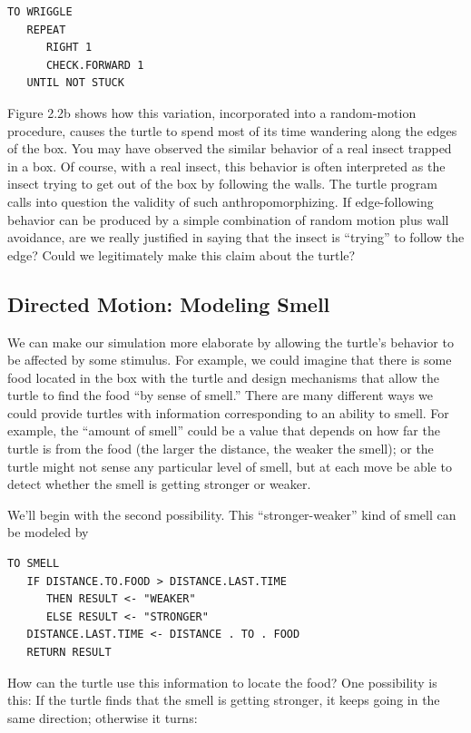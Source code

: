 \documentclass{book}
\begin{document}
\begin{verbatim}
TO WRIGGLE
   REPEAT
      RIGHT 1
      CHECK.FORWARD 1
   UNTIL NOT STUCK
\end{verbatim}
Figure 2.2b shows how this variation, incorporated into a random-motion
procedure, causes the turtle to spend most of its time wandering along
the edges of the box. You may have observed the similar behavior of
a real insect trapped in a box. Of course, with a real insect, this
behavior is often interpreted as the insect trying to get out of the
box by following the walls. The turtle program calls into question
the validity of such anthropomorphizing. If edge-following behavior
can be produced by a simple combination of random motion plus wall
avoidance, are we really justified in saying that the insect is ``trying'' to
follow the edge? Could we legitimately make this claim about the turtle?

\subsection{Directed Motion: Modeling Smell}

We can make our simulation more elaborate by allowing the turtle's
behavior to be affected by some stimulus. For example, we could imagine
that there is some food located in the box with the turtle and design
mechanisms that allow the turtle to find the food ``by sense of smell.''
There are many different ways we could provide turtles with information
corresponding to an ability to smell. For example, the ``amount of smell''
could be a value that depends on how far the turtle is from the food (the
larger the distance, the weaker the smell); or the turtle might not sense
any particular level of smell, but at each move be able to detect whether
the smell is getting stronger or weaker.

We'll begin with the second possibility. This ``stronger-weaker'' kind
of smell can be modeled by

\begin{verbatim}
TO SMELL
   IF DISTANCE.TO.FOOD > DISTANCE.LAST.TIME
      THEN RESULT <- "WEAKER"
      ELSE RESULT <- "STRONGER"
   DISTANCE.LAST.TIME <- DISTANCE . TO . FOOD
   RETURN RESULT
\end{verbatim}
How can the turtle use this information to locate the food? One possibility is this: If the turtle finds that the smell is getting stronger, it keeps going in the same direction; otherwise it turns:
\end{document}
